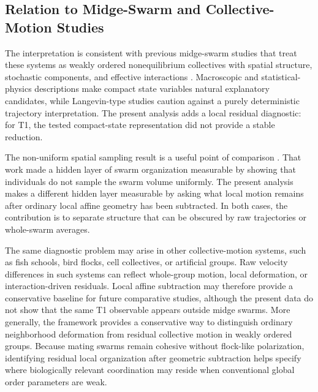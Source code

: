 \subsection{Relation to Midge-Swarm and Collective-Motion Studies}

The interpretation is consistent with previous midge-swarm studies that treat
these systems as weakly ordered nonequilibrium collectives with spatial
structure, stochastic components, and effective interactions
\cite{feng2023_sampling,reynolds2017_velocity_gravity,reynolds2018_langevin,reynolds2021_intrinsic,reynolds2024_spatial,sinhuber2021_eos}.
Macroscopic and statistical-physics descriptions make compact state variables
natural explanatory candidates, while Langevin-type studies caution against a
purely deterministic trajectory interpretation. The present analysis adds a
local residual diagnostic: for T1, the tested compact-state representation did
not provide a stable reduction.

The non-uniform spatial sampling result is a useful point of comparison
\cite{feng2023_sampling}. That work made a hidden layer of swarm organization
measurable by showing that individuals do not sample the swarm volume
uniformly. The present analysis makes a different hidden layer measurable by
asking what local motion remains after ordinary local affine geometry has been
subtracted. In both cases, the contribution is to separate structure that can
be obscured by raw trajectories or whole-swarm averages.

The same diagnostic problem may arise in other collective-motion systems, such
as fish schools, bird flocks, cell collectives, or artificial groups. Raw
velocity differences in such systems can reflect whole-group motion, local
deformation, or interaction-driven residuals. Local affine subtraction may
therefore provide a conservative baseline for future comparative studies,
although the present data do not show that the same T1 observable appears
outside midge swarms.
More generally, the framework provides a conservative way to distinguish
ordinary neighborhood deformation from residual collective motion in weakly
ordered groups. Because mating swarms remain cohesive without flock-like
polarization, identifying residual local organization after geometric
subtraction helps specify where biologically relevant coordination may reside
when conventional global order parameters are weak.
